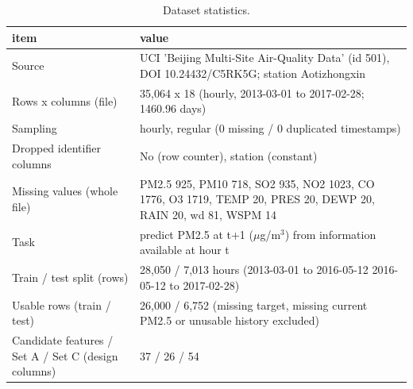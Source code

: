 \begin{table}[t]
\centering
\small
\caption{Dataset statistics.}
\label{tab:table_1_dataset_statistics}
\begin{tabular}{lp{11cm}}
\toprule
item & value \\
\midrule
Source & UCI 'Beijing Multi-Site Air-Quality Data' (id 501), DOI 10.24432/C5RK5G; station Aotizhongxin \\
Rows x columns (file) & 35,064 x 18 (hourly, 2013-03-01 to 2017-02-28; 1460.96 days) \\
Sampling & hourly, regular (0 missing / 0 duplicated timestamps) \\
Dropped identifier columns & No (row counter), station (constant) \\
Missing values (whole file) & PM2.5 925, PM10 718, SO2 935, NO2 1023, CO 1776, O3 1719, TEMP 20, PRES 20, DEWP 20, RAIN 20, wd 81, WSPM 14 \\
Task & predict PM2.5 at t+1 ($\mu$g/m$^3$) from information available at hour t \\
Train / test split (rows) & 28,050 / 7,013 hours (2013-03-01 to 2016-05-12 \textbar{} 2016-05-12 to 2017-02-28) \\
Usable rows (train / test) & 26,000 / 6,752 (missing target, missing current PM2.5 or unusable history excluded) \\
Candidate features / Set A / Set C (design columns) & 37 / 26 / 54 \\
\bottomrule
\end{tabular}
\end{table}
